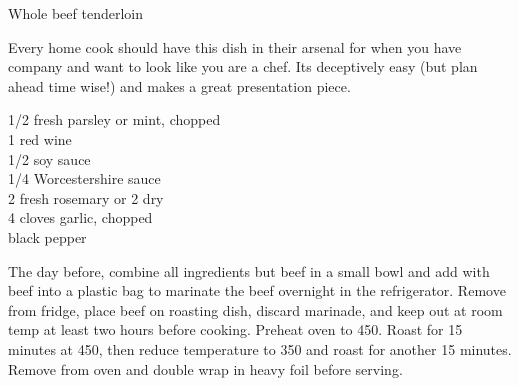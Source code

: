 \begin{entry}{Whole beef tenderloin}

\begin{open}
  Every home cook should have this dish in their arsenal for when you have
  company and want to look like you are a chef. Its deceptively easy (but plan
  ahead time wise!) and makes a great presentation piece.
\end{open}

\begin{ingredients}
    \SI{1/2}{\cup} fresh parsley or mint, chopped\\
    \SI{1}{\cup} red wine\\
    \SI{1/2}{\cup} soy sauce\\
    \SI{1/4}{\cup} Worcestershire sauce\\
    \SI{2}{\tblspoon} fresh rosemary or \SI{2}{\teaspoon} dry\\
    4 cloves garlic, chopped\\
    black pepper
\end{ingredients}
%
%
The day before, combine all ingredients but beef in a small bowl and add with
beef into a plastic bag to marinate the beef overnight in the
refrigerator. Remove from fridge, place beef on roasting dish, discard
marinade, and keep out at room temp at least two hours before cooking. Preheat
oven to \SI{450}{\degreeF}. Roast for 15 minutes at \SI{450}{\degreeF}, then
reduce temperature to 350 and roast for another 15 minutes. Remove from oven
and double wrap in heavy foil before serving.
%
\end{entry}